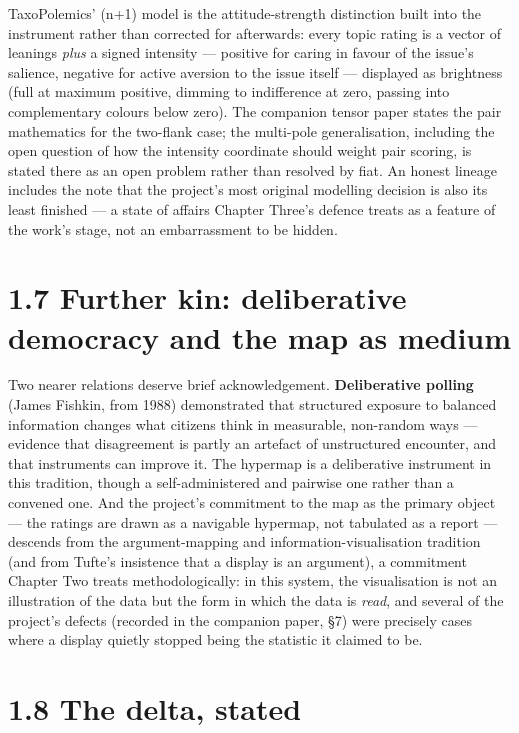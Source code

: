 TaxoPolemics' (n+1) model is the attitude-strength distinction built
into the instrument rather than corrected for afterwards: every topic
rating is a vector of leanings \emph{plus} a signed intensity ---
positive for caring in favour of the issue's salience, negative for
active aversion to the issue itself --- displayed as brightness (full at
maximum positive, dimming to indifference at zero, passing into
complementary colours below zero). The companion tensor paper states the
pair mathematics for the two-flank case; the multi-pole generalisation,
including the open question of how the intensity coordinate should
weight pair scoring, is stated there as an open problem rather than
resolved by fiat. An honest lineage includes the note that the project's
most original modelling decision is also its least finished --- a state
of affairs Chapter Three's defence treats as a feature of the work's
stage, not an embarrassment to be hidden.

\section{1.7 Further kin: deliberative democracy and the map as
medium}\label{further-kin-deliberative-democracy-and-the-map-as-medium}

Two nearer relations deserve brief acknowledgement. \textbf{Deliberative
polling} (James Fishkin, from 1988) demonstrated that structured
exposure to balanced information changes what citizens think in
measurable, non-random ways --- evidence that disagreement is partly an
artefact of unstructured encounter, and that instruments can improve it.
The hypermap is a deliberative instrument in this tradition, though a
self-administered and pairwise one rather than a convened one. And the
project's commitment to the map as the primary object --- the ratings
are drawn as a navigable hypermap, not tabulated as a report ---
descends from the argument-mapping and information-visualisation
tradition (and from Tufte's insistence that a display is an argument), a
commitment Chapter Two treats methodologically: in this system, the
visualisation is not an illustration of the data but the form in which
the data is \emph{read}, and several of the project's defects (recorded
in the companion paper, \S 7) were precisely cases where a display quietly
stopped being the statistic it claimed to be.

\section{1.8 The delta, stated}\label{the-delta-stated}

